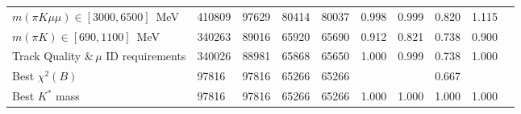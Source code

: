\begin{table}[ht!]
\begin{tabular}{l | l l| l l| l l| l |ll }
    $m(\pi K \mu\mu) \in [3000,6500]$~MeV& 410809 & 97629 & 80414 & 80037 & 0.998 & 0.999 & 0.820 & 1.115\\
    $m(\pi K) \in [690,1100]$~MeV& 340263 & 89016 & 65920 & 65690 & 0.912 & 0.821 & 0.738 & 0.900\\
    Track Quality $\&\,\mu$ ID requirements& 340026 & 88981 & 65868 & 65650 & 1.000 & 0.999 & 0.738 & 1.000\\
    \hline
    Best $\chi^{2}(B)$& 97816 & 97816 & 65266 & 65266 &&& 0.667 &\\
    Best $K^{*}$ mass& 97816 & 97816 & 65266 & 65266 & 1.000 & 1.000 & 1.000 & 1.000\\
    \hline\hline
  \end{tabular}
  \label{tab:presel:resmu}
\end{table}